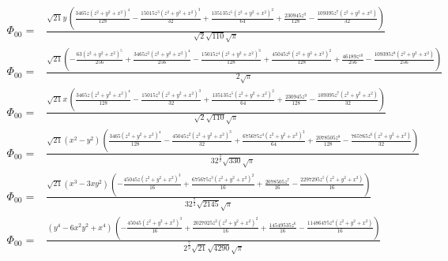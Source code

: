 \documentclass[10pt]{article}
\begin{document}
\begin{align*}
\Phi_{00} = &\frac{\sqrt{21} y\, \left( \frac{3465 z {{\left( {{z}^{2}}+{{y}^{2}}+{{x}^{2}}\right) }^{4}}}{128}-\frac{15015 {{z}^{3}} {{\left( {{z}^{2}}+{{y}^{2}}+{{x}^{2}}\right) }^{3}}}{32}+\frac{135135 {{z}^{5}} {{\left( {{z}^{2}}+{{y}^{2}}+{{x}^{2}}\right) }^{2}}}{64}+\frac{230945 {{z}^{9}}}{128}-\frac{109395 {{z}^{7}} \left( {{z}^{2}}+{{y}^{2}}+{{x}^{2}}\right) }{32}\right) }{\sqrt{2} \sqrt{110} \sqrt{\ensuremath{\pi} }} \\
\Phi_{00} = &\frac{\sqrt{21} \left( -\frac{63 {{\left( {{z}^{2}}+{{y}^{2}}+{{x}^{2}}\right) }^{5}}}{256}+\frac{3465 {{z}^{2}} {{\left( {{z}^{2}}+{{y}^{2}}+{{x}^{2}}\right) }^{4}}}{256}-\frac{15015 {{z}^{4}} {{\left( {{z}^{2}}+{{y}^{2}}+{{x}^{2}}\right) }^{3}}}{128}+\frac{45045 {{z}^{6}} {{\left( {{z}^{2}}+{{y}^{2}}+{{x}^{2}}\right) }^{2}}}{128}+\frac{46189 {{z}^{10}}}{256}-\frac{109395 {{z}^{8}} \left( {{z}^{2}}+{{y}^{2}}+{{x}^{2}}\right) }{256}\right) }{2 \sqrt{\ensuremath{\pi} }} \\
\Phi_{00} = &\frac{\sqrt{21} x\, \left( \frac{3465 z {{\left( {{z}^{2}}+{{y}^{2}}+{{x}^{2}}\right) }^{4}}}{128}-\frac{15015 {{z}^{3}} {{\left( {{z}^{2}}+{{y}^{2}}+{{x}^{2}}\right) }^{3}}}{32}+\frac{135135 {{z}^{5}} {{\left( {{z}^{2}}+{{y}^{2}}+{{x}^{2}}\right) }^{2}}}{64}+\frac{230945 {{z}^{9}}}{128}-\frac{109395 {{z}^{7}} \left( {{z}^{2}}+{{y}^{2}}+{{x}^{2}}\right) }{32}\right) }{\sqrt{2} \sqrt{110} \sqrt{\ensuremath{\pi} }} \\
\Phi_{00} = &\frac{\sqrt{21} \left( {{x}^{2}}-{{y}^{2}}\right) \, \left( \frac{3465 {{\left( {{z}^{2}}+{{y}^{2}}+{{x}^{2}}\right) }^{4}}}{128}-\frac{45045 {{z}^{2}} {{\left( {{z}^{2}}+{{y}^{2}}+{{x}^{2}}\right) }^{3}}}{32}+\frac{675675 {{z}^{4}} {{\left( {{z}^{2}}+{{y}^{2}}+{{x}^{2}}\right) }^{2}}}{64}+\frac{2078505 {{z}^{8}}}{128}-\frac{765765 {{z}^{6}} \left( {{z}^{2}}+{{y}^{2}}+{{x}^{2}}\right) }{32}\right) }{3 {{2}^{\frac{3}{2}}} \sqrt{330} \sqrt{\ensuremath{\pi} }} \\
\Phi_{00} = &\frac{\sqrt{21} \left( {{x}^{3}}-3 x {{y}^{2}}\right) \, \left( -\frac{45045 z {{\left( {{z}^{2}}+{{y}^{2}}+{{x}^{2}}\right) }^{3}}}{16}+\frac{675675 {{z}^{3}} {{\left( {{z}^{2}}+{{y}^{2}}+{{x}^{2}}\right) }^{2}}}{16}+\frac{2078505 {{z}^{7}}}{16}-\frac{2297295 {{z}^{5}} \left( {{z}^{2}}+{{y}^{2}}+{{x}^{2}}\right) }{16}\right) }{3 {{2}^{\frac{7}{2}}} \sqrt{2145} \sqrt{\ensuremath{\pi} }} \\
\Phi_{00} = &\frac{\left( {{y}^{4}}-6 {{x}^{2}} {{y}^{2}}+{{x}^{4}}\right) \, \left( -\frac{45045 {{\left( {{z}^{2}}+{{y}^{2}}+{{x}^{2}}\right) }^{3}}}{16}+\frac{2027025 {{z}^{2}} {{\left( {{z}^{2}}+{{y}^{2}}+{{x}^{2}}\right) }^{2}}}{16}+\frac{14549535 {{z}^{6}}}{16}-\frac{11486475 {{z}^{4}} \left( {{z}^{2}}+{{y}^{2}}+{{x}^{2}}\right) }{16}\right) }{{{2}^{\frac{7}{2}}} \sqrt{21} \sqrt{4290} \sqrt{\ensuremath{\pi} }} \\

\end{align*}
\end{document}
